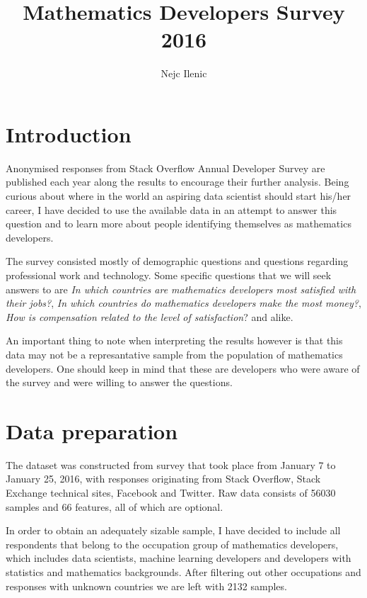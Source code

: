 \documentclass{article}
\begin{document}





\title{Mathematics Developers Survey 2016}
\author{Nejc Ilenic}
\date{}
\maketitle

\section{Introduction}
Anonymised responses from Stack Overflow Annual Developer Survey are published each year along the results to encourage their further analysis. Being curious about where in the world an aspiring data scientist should start his/her career, I have decided to use the available data in an attempt to answer this question and to learn more about people identifying themselves as mathematics developers.

The survey consisted mostly of demographic questions and questions regarding professional work and technology. Some specific questions that we will seek answers to are \textit{In which countries are mathematics developers most satisfied with their jobs?}, \textit{In which countries do mathematics developers make the most money?}, \textit{How is compensation related to the level of satisfaction}? and alike.

\vspace{2mm}

An important thing to note when interpreting the results however is that this data may not be a represantative sample from the population of mathematics developers. One should keep in mind that these are developers who were aware of the survey and were willing to answer the questions.

\section{Data preparation}
The dataset was constructed from survey that took place from January 7 to January 25, 2016, with responses originating from Stack Overflow, Stack Exchange technical sites, Facebook and Twitter. Raw data consists of 56030 samples and 66 features, all of which are optional.

In order to obtain an adequately sizable sample, I have decided to include all respondents that belong to the occupation group of mathematics developers, which includes data scientists, machine learning developers and developers with statistics and mathematics backgrounds. After filtering out other occupations and responses with unknown countries we are left with 2132 samples.
\end{document}
